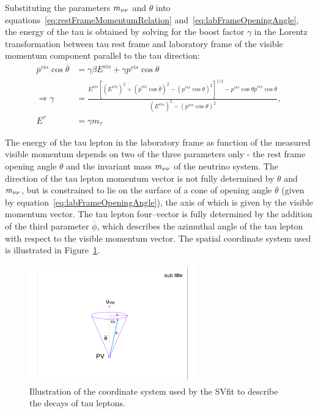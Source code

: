 Substituting the parameters $m_{\nu\nu}$ and $\theta$ into
equations~\ref{eq:restFrameMomentumRelation} and~\ref{eq:labFrameOpeningAngle},
the energy of the tau is obtained by solving for the boost factor $\gamma$ in
the Lorentz transformation between tau rest frame and laboratory frame of the
visible momentum component parallel to the tau direction:
\begin{align}
\overline{p}^{vis} \cos \overline{\theta} &= \gamma \beta E^{vis} + \gamma p^{vis} \cos\theta \nonumber \\ 
\Rightarrow \gamma &= \frac{E^{vis}[{\left( E^{vis} \right)^2 + \left( \overline{p}^{vis} \cos \overline{\theta} \right)^2 
 - \left( p^{vis} \cos \theta \right)^2}]^{1/2} - p^{vis} \cos \theta \overline{p}^{vis} \cos \overline{\theta}}{\left( E^{vis} \right)^2 
 - \left( p^{vis} \cos \theta \right)^2}, \nonumber \\
E^{\tau} &= \gamma m_\tau \nonumber
\end{align}

The energy of the tau lepton in the laboratory frame as function of the measured
visible momentum depends on two of the three parameters only - the rest frame
opening angle $\theta$ and the invariant mass $m_{\nu\nu}$ of the neutrino system.
The direction of the tau lepton momentum vector is not fully determined by
$\theta$ and $m_{\nu\nu}$, but is constrained to lie on the surface of a cone of
opening angle $\overline{\theta}$ (given by equation~\ref{eq:labFrameOpeningAngle}),
the axis of which is given by the visible momentum vector.  The tau lepton
four--vector is fully determined by the addition of the third parameter
$\overline{\phi}$, which describes the azimuthal angle of the tau lepton with respect
to the visible momentum vector.  The spatial coordinate system used is
illustrated in Figure~\ref{fig:svFitDecayParDiagram}.

\begin{figure}[t]
\begin{center}
\includegraphics*[width=72mm]{svfit_chapter/figures/decay_parameters_graphic.pdf}
\caption[Coordinate system of the SVfit]{Illustration of the coordinate system
used by the SVfit to describe the decays of tau leptons.}
\label{fig:svFitDecayParDiagram}
\end{center}
\end{figure} 

